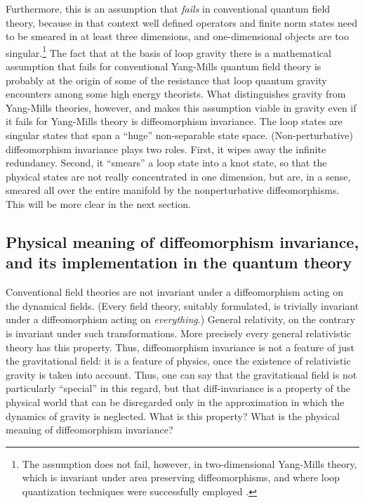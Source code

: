 \documentclass[12pt]{article}
\begin{document}
Furthermore, this is an assumption that {\em fails\/} in conventional 
quantum field theory, because in that context well defined operators 
and finite norm states need to be smeared in at least three 
dimensions, and one-dimensional objects are too singular.\footnote{The 
assumption does not fail, however, in two-dimensional Yang-Mills 
theory, which is invariant under area preserving diffeomorphisms, and 
where loop quantization techniques were successfully employed 
\cite{ALMMT}.} The fact that at the basis of loop gravity there is a 
mathematical assumption that fails for conventional Yang-Mills quantum 
field theory is probably at the origin of some of the resistance that 
loop quantum gravity encounters among some high energy theorists.  
What distinguishes gravity from Yang-Mills theories, however, and 
makes this assumption viable in gravity even if it fails for 
Yang-Mills theory is diffeomorphism invariance.  The loop states are 
singular states that span a ``huge'' non-separable state space.  
(Non-perturbative) diffeomorphism invariance plays two roles.  First, 
it wipes away the infinite redundancy.  Second, it ``smears'' a loop 
state into a knot state, so that the physical states are not really 
concentrated in one dimension, but are, in a sense, smeared all over 
the entire manifold by the nonperturbative diffeomorphisms.  This will 
be more clear in the next section.

\subsection{Physical meaning of diffeomorphism invariance, and 
its implementation in the quantum theory} \label{relational}

Conventional field theories are not invariant under a 
diffeomorphism acting on the dynamical fields.  (Every field 
theory, suitably formulated, is trivially invariant under a 
diffeomorphism acting on {\em everything}.)  General relativity, 
on the contrary is invariant under such transformations.  More 
precisely every general relativistic theory has this property.  
Thus, diffeomorphism invariance is not a feature of just the 
gravitational field: it is a feature of physics, once the 
existence of relativistic gravity is taken into account.  Thus, 
one can say that the gravitational field is not particularly 
``special'' in this regard, but that diff-invariance is a 
property of the physical world that can be disregarded only in 
the approximation in which the dynamics of gravity is neglected.  
What is this property?  What is the physical meaning of 
diffeomorphism invariance?
\end{document}

